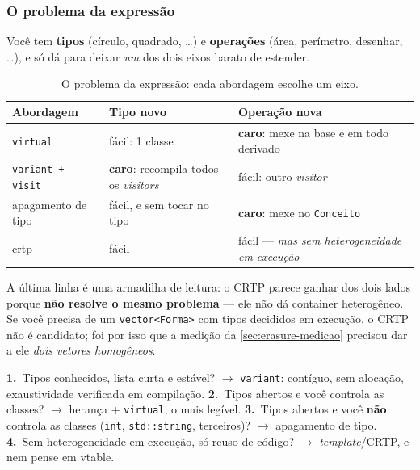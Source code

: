 \subsubsection{O problema da expressão}

Você tem \textbf{tipos} (círculo, quadrado, \ldots) e \textbf{operações} (área,
perímetro, desenhar, \ldots), e só dá para deixar \emph{um} dos dois eixos
barato de estender.

\begin{table}[htbp]
\centering
\caption{O problema da expressão: cada abordagem escolhe um eixo.}
\label{tab:expressao}
\footnotesize
\begin{tabular}{@{}lll@{}}
\toprule
\textbf{Abordagem} & \textbf{Tipo novo} & \textbf{Operação nova} \\
\midrule
\texttt{virtual}         & fácil: 1 classe & \textbf{caro}: mexe na base e em
                                             todo derivado \\
\texttt{variant + visit} & \textbf{caro}: recompila todos os \emph{visitors}
                                           & fácil: outro \emph{visitor} \\
apagamento de tipo       & fácil, e sem tocar no tipo & \textbf{caro}: mexe no
                                             \texttt{Conceito} \\
\gls{crtp}               & fácil & fácil --- \emph{mas sem heterogeneidade em
                                   execução} \\
\bottomrule
\end{tabular}
\end{table}

A última linha é uma armadilha de leitura: o CRTP parece ganhar dos dois lados
porque \textbf{não resolve o mesmo problema} --- ele não dá container
heterogêneo. Se você precisa de um \texttt{vector<Forma>} com tipos decididos em
execução, o CRTP não é candidato; foi por isso que a medição da
\cref{sec:erasure-medicao} precisou dar a ele \emph{dois vetores homogêneos}.

\begin{regra}
\textbf{1.}~Tipos conhecidos, lista curta e estável? $\rightarrow$
\texttt{variant}: contíguo, sem alocação, exaustividade verificada em
compilação. \textbf{2.}~Tipos abertos e você controla as classes? $\rightarrow$
herança + \texttt{virtual}, o mais legível. \textbf{3.}~Tipos abertos e você
\textbf{não} controla as classes (\texttt{int}, \texttt{std::string},
terceiros)? $\rightarrow$ apagamento de tipo. \textbf{4.}~Sem heterogeneidade em
execução, só reuso de código? $\rightarrow$ \emph{template}/CRTP, e nem pense em
vtable.
\end{regra}

